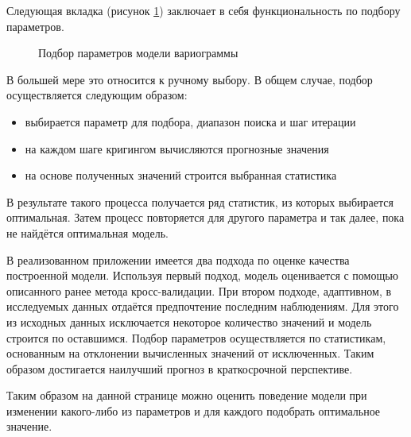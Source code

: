 Следующая вкладка (рисунок \ref{img:mod_fit}) заключает в себя функциональность по подбору параметров.
\begin{figure}[ht]
\caption{Подбор параметров модели вариограммы}
\label{img:mod_fit}
\end{figure}
В большей мере это относится к ручному выбору. В общем случае, подбор осуществляется следующим образом:
\begin{itemize}
	\item выбирается параметр для подбора, диапазон поиска и шаг итерации
	\item на каждом шаге кригингом вычисляются прогнозные значения
	\item на основе полученных значений строится выбранная статистика
\end{itemize}
В результате такого процесса получается ряд статистик, из которых выбирается оптимальная. Затем процесс повторяется для другого параметра и так далее, пока не найдётся оптимальная модель.

В реализованном приложении имеется два подхода по оценке качества построенной модели. Используя первый подход, модель оценивается с помощью описанного ранее метода кросс-валидации. При втором подходе, адаптивном, в исследуемых данных отдаётся предпочтение последним наблюдениям. Для этого из исходных данных исключается некоторое количество значений и модель строится по оставшимся. Подбор параметров осуществляется по статистикам, основанным на отклонении вычисленных значений от исключенных. Таким образом достигается наилучший прогноз в краткосрочной перспективе.

Таким образом на данной странице можно оценить поведение модели при изменении какого-либо из параметров и для каждого подобрать оптимальное значение.

